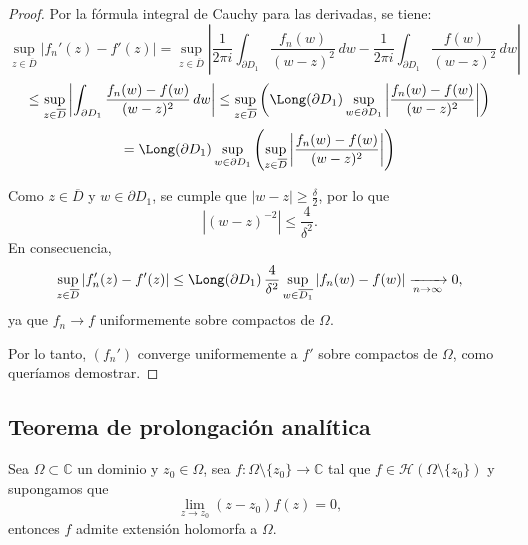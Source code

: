 \begin{proof}
    Por la fórmula integral de Cauchy para las derivadas, se tiene:
    \[
        \sup_{z \in \overline{D}} |f_n'(z) - f'(z)|
        = \sup_{z \in \overline{D}} \left| \frac{1}{2\pi i} \int_{\partial D_1} \frac{f_n(w)}{(w - z)^2}\,dw - \frac{1}{2\pi i} \int_{\partial D_1} \frac{f(w)}{(w - z)^2}\,dw \right|
    \]
    \[
        \leq \sup_{z \in \overline{D}} \left| \int_{\partial D_1} \frac{f_n(w) - f(w)}{(w - z)^2}\,dw \right|
        \leq \sup_{z \in \overline{D}} \left( \Long(\partial D_1) \sup_{w \in \partial D_1} \left| \frac{f_n(w) - f(w)}{(w - z)^2} \right| \right)
    \]
    \[
        = \Long(\partial D_1) \sup_{w \in \partial D_1} \left( \sup_{z \in \overline{D}} \left|\frac{f_n(w) - f(w)}{(w - z)^2} \right| \right)
    \]

    Como $z \in \overline{D}$ y $w \in \partial D_1$, se cumple que $|w - z| \geq \tfrac{\delta}{2}$, por lo que
    \[
        |(w - z)^{-2}| \leq \frac{4}{\delta^2}.
    \]
    En consecuencia,
    \[
        \sup_{z \in \overline{D}} |f_n'(z) - f'(z)|
        \leq \Long(\partial D_1)\, \frac{4}{\delta^2} \sup_{w \in \overline{D_1}} |f_n(w) - f(w)|
        \xrightarrow[n \to \infty]{} 0,
    \]
    ya que $f_n \to f$ uniformemente sobre compactos de $\Omega$.

    Por lo tanto, $(f_n')$ converge uniformemente a $f'$ sobre compactos de $\Omega$, como queríamos demostrar.
\end{proof}

\subsection{Teorema de prolongación analítica}
\begin{teorema} 
    Sea $\Omega \subset \mathbb{C}$ un dominio y $z_0 \in \Omega$, sea $f : \Omega \setminus \{ z_0 \} \to \mathbb{C}$ tal que $f \in \mathcal{H}(\Omega \setminus \{ z_0 \})$ y supongamos que 
    \[
        \lim_{z \to z_0} (z - z_0) f(z) = 0,
    \]
    entonces $f$ admite extensión holomorfa a $\Omega$.
\end{teorema}

